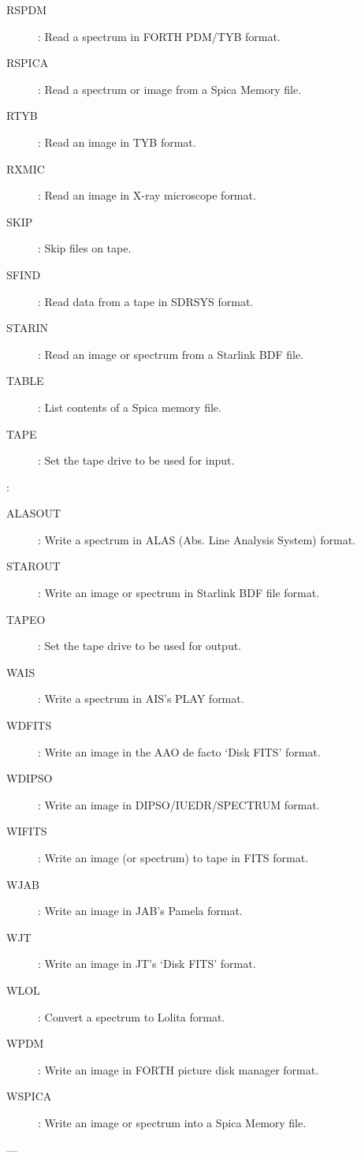 \begin {description}
\begin{description}
\begin{description}
\item [RSPDM]: Read a spectrum in FORTH PDM/TYB format.
\item [RSPICA]: Read a spectrum or image from a Spica Memory file.
\item [RTYB]: Read an image in TYB format.
\item [RXMIC]: Read an image in X-ray microscope format.
\item [SKIP]: Skip files on tape.
\item [SFIND]: Read data from a tape in SDRSYS format.
\item [STARIN]: Read an image or spectrum from a Starlink BDF file.
\item [TABLE]: List contents of a Spica memory file.
\item [TAPE]: Set the tape drive to be used for input.
\end{description}

\item [Output]\hspace{-1.5mm}:
\begin{description}
\item [ALASOUT]: Write a spectrum in ALAS (Abs. Line Analysis System) format.
\item [STAROUT]: Write an image or spectrum in Starlink BDF file format.
\item [TAPEO]: Set the tape drive to be used for output.
\item [WAIS]: Write a spectrum in AIS's PLAY format.
\item [WDFITS]: Write an image in the AAO de facto `Disk FITS' format.
\item [WDIPSO]: Write an image in DIPSO/IUEDR/SPECTRUM format.
\item [WIFITS]: Write an image (or spectrum) to tape in FITS format.
\item [WJAB]: Write an image in JAB's Pamela format.
\item [WJT]: Write an image in JT's `Disk FITS' format.
\item [WLOL]: Convert a spectrum to Lolita format.
\item [WPDM]: Write an image in FORTH picture disk manager format.
\item [WSPICA]: Write an image or spectrum into a Spica Memory file.
\end{description}
\end{description}

\item [DISPLAY] ---


\end{description}
